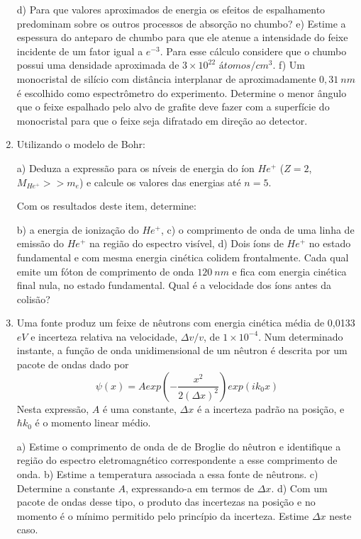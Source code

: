 \begin{enumerate}[start=1,label={\bfseries Q\arabic*.}]
d) Para que valores aproximados de energia os efeitos de espalhamento predominam sobre os outros processos de absorção no chumbo?
e) Estime a espessura do anteparo de chumbo para que ele atenue a intensidade do feixe incidente de um fator igual a $e^{-3}$. Para esse cálculo considere que o chumbo possui uma densidade aproximada de $3 \times 10^{22}$ $átomos/cm^{3}$.
f) Um monocristal de silício com distância interplanar de aproximadamente $0,31 \ nm$ é escolhido como espectrômetro do experimento. Determine o menor ângulo que o feixe espalhado pelo alvo de grafite deve fazer com a superfície do monocristal para que o feixe seja difratado em direção ao detector.




\item Utilizando o modelo de Bohr:

a) Deduza a expressão para os níveis de energia do íon $He^{+}$ ($Z = 2$, $M_{He^{+}} >> m_{e}$) e calcule os valores das energias até $n = 5$.

Com os resultados deste item, determine:

b) a energia de ionização do $He^{+}$,
c) o comprimento de onda de uma linha de emissão do $He^{+}$ na região do espectro visível,
d) Dois íons de $He^{+}$ no estado fundamental e com mesma energia cinética colidem frontalmente. Cada qual emite um fóton de comprimento de onda $120 \ nm$ e fica com energia cinética final nula, no estado fundamental. Qual é a velocidade dos íons antes da colisão?




\item Uma fonte produz um feixe de nêutrons com energia cinética média de 0,0133 $eV$ e incerteza relativa na velocidade, $\Delta v/v$, de $1 \times 10^{-4}$. Num determinado instante, a função de onda unidimensional de um nêutron é descrita por um pacote de ondas dado por
$$
\psi(x) = A exp \left(  -\frac{x^{2}}{2 (\Delta x)^{2}}  \right) exp(i k_{0} x)
$$
Nesta expressão, $A$ é uma constante, $\Delta x$ é a incerteza padrão na posição, e $\hbar k_{0}$ é o momento linear médio.

a) Estime o comprimento de onda de de Broglie do nêutron e identifique a região do espectro eletromagnético correspondente a esse comprimento de onda.
b) Estime a temperatura associada a essa fonte de nêutrons.
c) Determine a constante $A$, expressando-a em termos de $\Delta x$.
d) Com um pacote de ondas desse tipo, o produto das incertezas na posição e no momento é o mínimo permitido pelo princípio da incerteza. Estime $\Delta x$ neste caso.




\end{enumerate}
